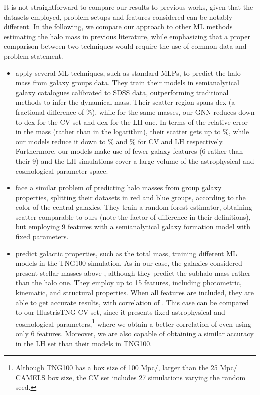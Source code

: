 \documentclass[twocolumn]{aastex631}
\begin{document}
It is not straightforward to compare our results to previous works, given that the datasets employed, problem setups and features considered can be notably different. In the following, we compare our approach to other ML methods estimating the halo mass in previous literature, while emphasizing that a proper comparison between two techniques would require the use of common data and problem statement.

\begin{itemize}

\item \cite{2019MNRAS.490.2367C} apply several ML techniques, such as standard MLPs, to predict the halo mass from galaxy groups data. They train their models in semianalytical galaxy catalogues calibrated to SDSS data, outperforming traditional methods to infer the dynamical mass. Their  scatter region spans  dex (a fractional difference of \%), while for the same masses, our GNN reduces down to  dex for the CV set and  dex for the LH one. In terms of the relative error in the mass (rather than in the logarithm), their scatter gets up to \%, while our models reduce it down to  \% and  \% for CV and LH respectively. Furthermore, our models make use of fewer galaxy features (6 rather than their 9) and the LH simulations cover a large volume of the astrophysical and cosmological parameter space.

\item \cite{2019ApJ...881...74M} face a similar problem of predicting halo masses from group galaxy properties, splitting their datasets in red and blue groups, according to the color of the central galaxies. They train a random forest estimator, obtaining scatter comparable to ours (note the  factor of difference in their definitions), but employing 9 features with a semianalytical galaxy formation model with fixed parameters.

\item \cite{2021arXiv211101185V} predict galactic properties, such as the total mass, training different ML models in the TNG100 simulation. As in our case, the galaxies considered present stellar masses above , although they predict the subhalo mass rather than the halo one. They employ up to 15 features, including photometric, kinematic, and structural properties. When all features are included, they are able to get accurate results, with correlation of . This case can be compared to our IllustrisTNG CV set, since it presents fixed astrophysical and cosmological parameters,\footnote{Although TNG100 has a box size of 100 Mpc/, larger than the 25 Mpc/ CAMELS box size, the CV set includes 27 simulations varying the random seed.} where we obtain a better correlation of  even using only 6 features. Moreover, we are also capable of obtaining a similar accuracy in the LH set than their models in TNG100.


\end{itemize}
\end{document}
